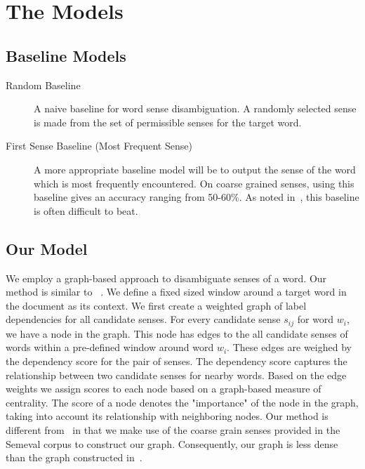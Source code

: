 \documentclass[12pt,letterpaper]{article}
\newcommand{\blue}[1]{\textcolor{RoyalBlue}{#1}}
\newcommand{\instructions}[1]{\blue{\textit{#1}}}
\begin{document}
\section{The Models}
\label{sec:models}

\subsection{Baseline Models}
\label{sec:baseline-models}
\begin{description}
\item[Random Baseline] A naive baseline for word sense disambiguation. A randomly selected sense is made from the set of permissible senses for the target word. \\
\item[First Sense Baseline (Most Frequent Sense)] A more appropriate baseline model will be to output the sense of the word which is most frequently encountered. On coarse grained senses, using this baseline gives an accuracy ranging from 50-60\%. As noted in~\cite{navigli2009word}, this baseline is often difficult to beat.
\end{description}
%
\subsection{Our Model}
\label{sec:proposed-models}
We employ a graph-based approach to disambiguate senses of a word. Our method is similar to ~\cite{Sinha}. We define a fixed sized window around a target word in the document as its context. We first create a weighted graph of label dependencies for all candidate senses. For every candidate sense $s_{ij}$ for word $w_i$, we have a node in the graph. This node has edges to the all candidate senses of words within a pre-defined window around word $w_i$. These edges are weighed by the dependency score for the pair of senses. The dependency score captures the relationship between two candidate senses for nearby words. Based on the edge weights we assign scores to each node based on a graph-based measure of centrality. The score of a node denotes the "importance" of the node in the graph, taking into account its relationship with neighboring nodes.
Our method is different from~\cite{Sinha} in that we make use of the coarse grain senses provided in the Semeval corpus to construct our graph. Consequently, our graph is less dense than the graph constructed in~\cite{Sinha}.
\end{document}
